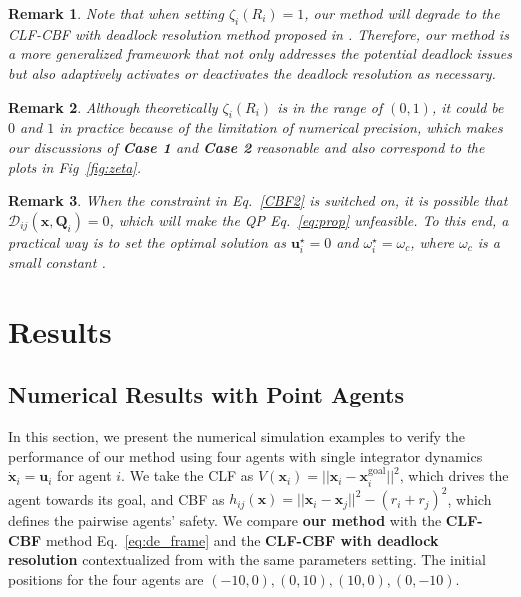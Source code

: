 \documentclass[letterpaper, 10 pt, conference]{ieeeconf}
\theoremstyle{plain}
\newtheorem{remark}{Remark}
\begin{document}
\begin{remark}
Note that when setting $\zeta_i(R_i) = 1$, our method will degrade to the CLF-CBF with deadlock resolution method proposed in \cite{reis2020control}. Therefore, our method is a more generalized framework that not only addresses the potential deadlock issues but also adaptively
activates or deactivates
the deadlock resolution as necessary.
\end{remark}

\begin{remark}
Although theoretically $\zeta_i(R_i)$ is in the range of $(0,1)$, it could be $0$ and $1$ in practice because of
the limitation of numerical precision, which makes our discussions of \textbf{Case 1} and \textbf{Case 2} reasonable and also correspond to the plots in Fig~\ref{fig:zeta}.
\end{remark}

\begin{remark}
When the constraint in Eq.~\eqref{CBF2} is switched on, it is possible that $\mathcal{D}_{ij}(\mathbf{x}, \mathbf{Q}_i) = 0$, which will make the QP Eq.~\eqref{eq:prop} unfeasible. To this end, a practical way is to set the optimal solution as $\mathbf{u}_i^{\star} = 0$ and $\omega_i^{\star} = \omega_c$, where $\omega_c$ is a small constant \cite{reis2020control}.
\end{remark}





\section{Results}
\subsection{Numerical Results with Point Agents}
In this section, we present the numerical simulation examples to verify the performance of our method using four agents with single integrator dynamics $\dot{\mathbf{x}}_i = \mathbf{u}_i$ for agent $i$. 
We take the CLF as $V(\mathbf{x}_i) = || \mathbf{x}_i - \mathbf{x}^\mathrm{goal}_{i}||^2$, which drives the agent towards its goal,
and CBF as $h_{ij}(\mathbf{x}) = ||\mathbf{x}_i - \mathbf{x}_j||^2 - (r_i + r_j)^2$, which defines the pairwise agents' safety. We compare \textbf{our method} with the \textbf{CLF-CBF} method Eq.~\eqref{eq:de_frame} and the \textbf{CLF-CBF with deadlock resolution} contextualized from \cite{reis2020control} with the same parameters setting. The initial positions for the four agents are $(-10,0), (0,10), (10,0), (0, -10)$.
\end{document}
